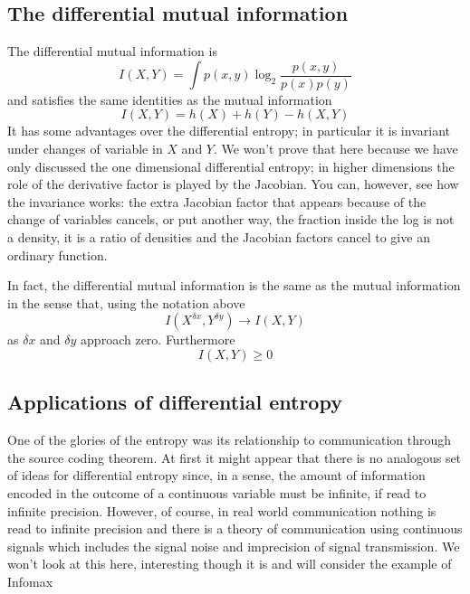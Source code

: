 \documentclass[12pt]{article}
\begin{document}
\subsection*{The differential mutual information}

The differential mutual information is
\begin{equation}
  I(X,Y)=\int p(x,y)\log_2{\frac{p(x,y)}{p(x)p(y)}}
\end{equation}
and satisfies the same identities as the mutual information
\begin{equation}
  I(X,Y)=h(X)+h(Y)-h(X,Y)
\end{equation}
It has some advantages over the differential entropy; in particular it
is invariant under changes of variable in $X$ and $Y$. We won't prove that here
because we have only discussed the one dimensional differential
entropy; in higher dimensions the role of the derivative factor is
played by the Jacobian.  You can, however, see how the invariance
works: the extra Jacobian factor that appears because of the change of
variables cancels, or put another way, the fraction inside the log is
not a density, it is a ratio of densities and the Jacobian factors
cancel to give an ordinary function.

In fact, the differential mutual information is the same as the mutual information in the sense that, using the notation above
\begin{equation}
  I(X^{\delta x},Y^{\delta y})\rightarrow I(X,Y)
\end{equation}
as $\delta x$ and $\delta y$ approach zero. Furthermore
\begin{equation}
  I(X,Y)\ge 0
\end{equation}


\subsection*{Applications of differential entropy}

One of the glories of the entropy was its relationship to
communication through the source coding theorem. At first it might
appear that there is no analogous set of ideas for differential
entropy since, in a sense, the amount of information encoded in the
outcome of a continuous variable must be infinite, if read to infinite
precision. However, of course, in real world communication nothing is
read to infinite precision and there is a theory of communication
using continuous signals which includes the signal noise and
imprecision of signal transmission. We won't look at this here,
interesting though it is and will consider the example of Infomax
\end{document}
